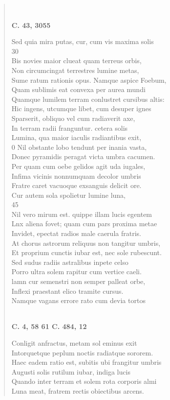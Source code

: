 \documentclass[11pt, a4paper]{report}
\begin{document}
\begin{verse}
        ﻿\pagebreak 
    \begin{center} \textbf{C. 43, 3055} \end{center}Sed quia mira putas, cur, cum vis maxima solis \\ 30 \\ Bis novies maior clueat quam terreus orbis, \\ Non circumcingat terrestres lumine metas, \\ Sume ratum rationis opus. Namque aspice Foebum, \\ Quam sublimis eat convexa per aurea mundi \\ Quamque lumilem terram conlustret cursibus altis: \\ Hic ingens, utcumque libet, cum desuper ignes \\ Sparserit, obliquo vel cum radiaverit axe, \\ In terram radii franguntur. cetera solis \\ Lumina, qua maior iaculis radiantibus exit, \\ 0 Nil obstante lobo tendunt per inania vasta, \\ Donec pyramidis peragat victa umbra cacumen. \\ Per quam cum oebe gelidos agit uda iugales, \\ Infima vicinis nonnumquam decolor umbris \\ Fratre caret vacuoque exsanguis delicit ore. \\ Cur autem sola spolietur lumine luna, \\ 45 \\ Nil vero mirum est. quippe illam lucis egentem \\ Lnx aliena fovet; quam cum pars proxima metae \\ Invidet, epectat radios male caerula fratris. \\ At chorus astrorum reliquus non tangitur umbris, \\ Et proprium cunctis iubar est, nec sole rubescunt. \\ Sed sudus radiis astralibus inpete celso \\ Porro ultra solem rapitur cum vertice caeli. \\ lamn cur semenstri non semper palleat orbe, \\ Inflexi praestant elico tramite cursus. \\ Namque vagans errore rato cum devia tortos \\ 
        ﻿\pagebreak 
    \begin{center} \textbf{C. 4, 58 61 C. 484, 12} \end{center}Conligit anfractus, metam sol eminus exit \\ Intorquetque peplum noctis radiatque sororem. \\ Haec eadem ratio est, subitis ubi frangitur umbris \\ Augusti solis rutilum iubar, indiga lucis \\ Quando inter terram et solem rota corporis almi \\ Luna meat, fratrem rectis obiectibus arcens. \\ 
      \end{verse}
  
\end{document}
